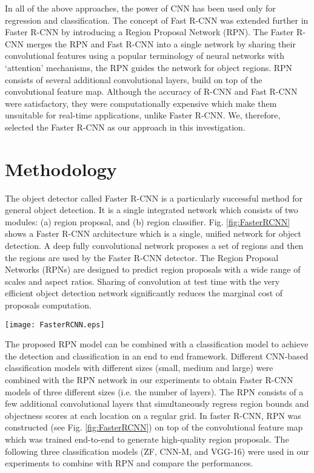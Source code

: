 \documentclass[conference]{IEEEtran}       %
\begin{document}
In all of the above approaches, the power of CNN has been used only for regression and classification. The concept of Fast R-CNN was extended further in Faster R-CNN \cite{renNIPS15fasterrcnn} by introducing a Region Proposal Network (RPN).  The Faster R-CNN merges the RPN and Fast R-CNN into a single network by sharing their convolutional features using a popular terminology of neural networks with `attention' mechanisms, the RPN guides the network for object regions. RPN consists of several additional convolutional layers, build on top of the convolutional feature map.  Although the accuracy of R-CNN and Fast R-CNN were satisfactory, they were computationally expensive which make them unsuitable for real-time applications, unlike Faster R-CNN. We, therefore, selected the  Faster R-CNN \cite{renNIPS15fasterrcnn} as our approach in this investigation.
\section{Methodology}
\label{method}
The object detector called Faster R-CNN \cite{renNIPS15fasterrcnn} is a particularly successful method for general object detection. It is a single integrated network which consists of two modules: (a) region proposal, and (b) region classifier.  Fig. \ref{fig:FasterRCNN} shows a Faster R-CNN architecture which is a single, unified network for object detection. A deep fully convolutional network proposes a set of regions and then the regions are used by the Faster R-CNN \cite{girshickICCV15fastrcnn} detector. The Region Proposal Networks (RPNs) are designed to predict region proposals with a wide range of scales and aspect ratios. Sharing of convolution at test time with the very efficient object detection network \cite{girshickICCV15fastrcnn} significantly reduces the marginal cost of proposals computation.

\begin{figure*}[!htb]
    \centering
      \texttt{[image: FasterRCNN.eps]}
    \caption{ An architecture of Faster R-CNN. Here, the feature map is generated by 5 layers convolution which is shared by the RPN network and the region classifier.}
   \label{fig:FasterRCNN}
   \vspace{-4ex}
\end{figure*}

The proposed RPN model \cite{renNIPS15fasterrcnn} can be combined with a classification model to achieve the detection and classification in an end to end framework. Different CNN-based classification models with different sizes (small, medium and large) were combined with the RPN network in our experiments to obtain Faster R-CNN models of three different sizes (i.e. the number of layers). The RPN consists of a few additional convolutional layers that simultaneously regress region bounds and objectness scores at each location on a regular grid. In faster R-CNN, RPN was constructed (see Fig. \ref{fig:FasterRCNN}) on top of the convolutional feature map which was trained end-to-end to generate high-quality region proposals. The following three classification models (ZF, CNN-M, and VGG-16) were used in our experiments to combine with RPN and compare the performances. 
\end{document}
